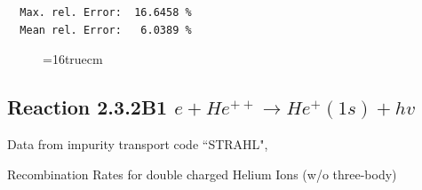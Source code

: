 \documentclass[12pt,dvipdfmx]{article}
\begin{document}
\begin{small}
\begin{verbatim}
  Max. rel. Error:  16.6458 %
  Mean rel. Error:   6.0389 %

\end{verbatim}\end{small}
\begin{figure} \label{2.3.2B0}
\epsfxsize=16truecm
\end{figure}
\newpage


\subsection{
Reaction 2.3.2B1  $e + He^{++} \rightarrow He^+(1s) + hv$
}
Data from impurity transport code ``STRAHL", \cite{kn:Behringer}

  Recombination Rates for double charged Helium Ions (w/o three-body)
\end{document}
